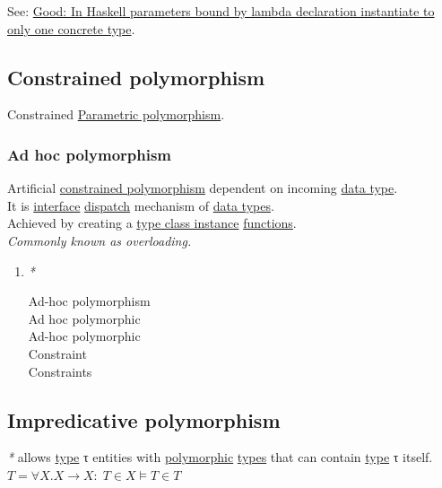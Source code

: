 \documentclass[a4paper,14pt,oneside]{book}
\begin{document}
See: \hyperref[org67f5ff0]{Good: In Haskell parameters bound by lambda declaration instantiate to only one concrete type}.\\

\subsection{\label{org0937719}Constrained polymorphism}
\label{sec:orge7d85fd}
Constrained \hyperref[org7500c38]{Parametric polymorphism}.\\

\subsubsection{\label{org3ee9179}Ad hoc polymorphism}
\label{sec:org5136559}
Artificial \hyperref[org0937719]{constrained polymorphism} dependent on incoming \hyperref[orgb52ba15]{data type}.\\
It is \hyperref[orgcff22eb]{interface} \hyperref[orge055908]{dispatch} mechanism of \hyperref[org61ba556]{data types}.\\
Achieved by creating a \hyperref[org67f798d]{type class instance} \hyperref[org41df67c]{functions}.\\

\emph{Commonly known as overloading.}\\

\begin{enumerate}
\item \emph{*}
\label{sec:org2437d44}

\label{orgf7f387b}Ad-hoc polymorphism\\
\label{orgcc6387c}Ad hoc polymorphic\\
\label{org962a100}Ad-hoc polymorphic\\
\label{org21a6f8c}Constraint\\
\label{orgbf9ce87}Constraints\\
\end{enumerate}

\subsection{\label{orga03e8b8}Impredicative polymorphism}
\label{sec:org2388dba}
\emph{*} allows \hyperref[org86debe5]{type} τ entities with \hyperref[orgede9994]{polymorphic} \hyperref[orgb4b53b9]{types} that can contain \hyperref[org86debe5]{type} τ itself.\\
\(T = \forall X. X \to X : \; T \in X \vDash T \in T\)\\
\end{document}
